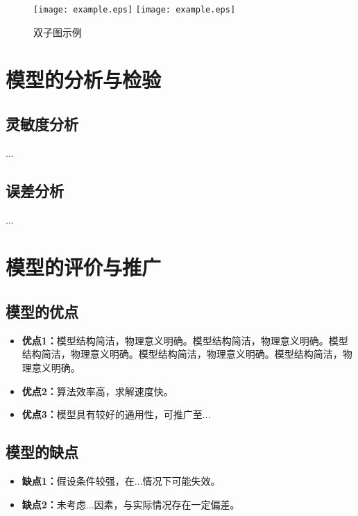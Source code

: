 \documentclass[withoutpreface,notoc]{cumcmthesis}
\begin{document}
	\begin{figure}[ht]
		\centering
		{\texttt{[image: example.eps]}}
		\hfill %
		{\texttt{[image: example.eps]}}
		\caption{双子图示例}
		\label{fig:双图}
	\end{figure}
	
	\section{模型的分析与检验}
	\subsection{灵敏度分析}
	...
	\subsection{误差分析}
	...
	\section{模型的评价与推广}
	\subsection{模型的优点}
	\begin{itemize}[itemindent=2em]
		\item \textbf{优点1：}模型结构简洁，物理意义明确。模型结构简洁，物理意义明确。模型结构简洁，物理意义明确。模型结构简洁，物理意义明确。模型结构简洁，物理意义明确。
		\item \textbf{优点2：}算法效率高，求解速度快。
		\item \textbf{优点3：}模型具有较好的通用性，可推广至...
	\end{itemize}
	\subsection{模型的缺点}
	\begin{itemize}[itemindent=2em]
		\item \textbf{缺点1：}假设条件较强，在...情况下可能失效。
		\item \textbf{缺点2：}未考虑...因素，与实际情况存在一定偏差。
	\end{itemize}
	
	
\end{document}
